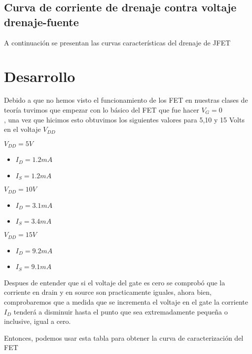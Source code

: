 \documentclass{mylib/reporteConCalif}
\begin{document}

\subsection{Curva de corriente de drenaje contra voltaje drenaje-fuente}

A continuación se presentan las curvas características del drenaje de JFET




  \newpage
\section{Desarrollo}

Debido a que no hemos visto el funcionamiento de los FET en nuestras clases de teoría tuvimos que empezar con lo básico del FET que fue hacer $V_{G} = 0$ \\, una vez que hicimos esto obtuvimos los siguientes valores para 5,10 y 15 Volts en el voltaje $V_{DD}$

\textbf{$V_{DD} = 5 V$}
\begin{itemize}
  \item $I_D = 1.2 mA$
  \item $I_S = 1.2 mA$
\end{itemize}

\textbf{$V_{DD} = 10 V$}
\begin{itemize}
  \item $I_D = 3.1 mA$
  \item $I_S = 3.4 mA$
\end{itemize}

\textbf{$V_{DD} = 15 V$}
\begin{itemize}
  \item $I_D = 9.2 mA$
  \item $I_S = 9.1 mA$
\end{itemize}

Despues de entender que si el voltaje del gate es cero se comprobó que la corriente en drain y en source son practicamente iguales, ahora bien, comprobaremos que a medida que se incrementa el voltaje en el gate la corriente $I_D$ tenderá a disminuir hasta el punto que sea extremadamente pequeña o inclusive, igual a cero.

\newpage
Entonces, podemos usar esta tabla para obtener la curva de caracterización del FET
\vspace{8cm}
\end{document}
